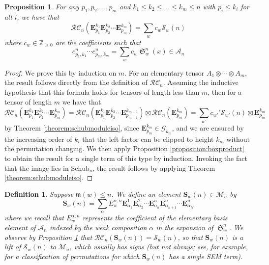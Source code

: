 \documentclass[pdflatex,sn-mathphys-num]{sn-jnl}
\numberwithin{equation}{subsection}
\DeclareMathOperator{\sch}{\mathfrak{S}}
\newcommand{\grass}{\mathcal{G}}
\newcommand{\RC}{\mathcal{RC}}
\newcommand{\coma}{\mathcal{A}}
\newcommand{\maxd}{\mathfrak{m}}
\theoremstyle{thmstyleone}
\newtheorem{proposition}[lemma]{Proposition}
\theoremstyle{thmstylethree}
\newtheorem{definition}[lemma]{Definition}
\theoremstyle{thmstyletwo}
\begin{document}
\begin{proposition} \label{proposition:eproductworks}
For any $p_1,p_2,\ldots,p_m$ and $k_1\leq k_2\leq\ldots\leq k_m\leq n$ with $p_i\leq k_i$ for all $i$, we have that
$$\RC_n(\mathbf{E}_{p_1}^{k_1}\mathbf{E}_{p_2}^{k_2}\cdots\mathbf{E}_{p_m}^{k_m}) = \sum_{w} c_w\mathcal{S}_w(n)$$
where $c_w\in \mathbb{Z}_{\geq 0}$ are the coefficients such that
$$e_{p_1,k_1}^n\cdots e_{p_m,k_m}^n = \sum_w c_w \sch_w^n(x)\in \coma_n$$
\end{proposition}
\begin{proof}
We prove this by induction on $m$. For an elementary tensor $A_1\otimes \cdots \otimes A_m$, the result follows directly from the definition of $\RC_n$. Assuming the inductive hypothesis that this formula holds for tensors of length less than $m$, then for a tensor of length $m$ we have that
$$\RC_n(\mathbf{E}_{p_1}^{k_1}\mathbf{E}_{p_2}^{k_2}\cdots\mathbf{E}_{p_m}^{k_m}) = \RC_n(\mathbf{E}_{p_1}^{k_1}\mathbf{E}_{p_2}^{k_2}\cdots\mathbf{E}_{p_{m-1}}^{k_{m-1}})\boxtimes \RC_n(\mathbf{E}_{p_m}^{k_m})=\sum_{w'} c_{w'}' \mathcal{S}_{w'}(n)\boxtimes \mathbf{E}_{p_m}^{k_m}$$
by Theorem \ref{theorem:schubmoduleiso}, since $\mathbf{E}_{p_m}^{k_m}\in\grass_{k_m}$, and we are ensured by the increasing order of $k_i$ that the left factor can be clipped to height $k_m$ without the permutation changing. We then apply Proposition \ref{proposition:boxproduct} to obtain the result for a single term of this type by induction. Invoking the fact that the image lies in $\mathrm{Schub}_n$, the result follows by applying Theorem \ref{theorem:schubmoduleiso}.
\end{proof}


\begin{definition}
  Suppose $\maxd(w)\leq n$. We define an element $\mathbf{S}_w(n)\in \mathcal{M}_n$ by
  $$\mathbf{S}_w(n) = \sum_{\alpha} E_w^{\alpha;n}\mathbf{E}_{\alpha_1}^1 \mathbf{E}_{\alpha_2}^2 \cdots  \mathbf{E}_{\alpha_n}^n\mathbf{E}_{\alpha_{n+1}}^n\cdots \mathbf{E}_{\alpha_N}^n$$
  where we recall that $E_w^{\alpha;n}$ represents the coefficient of the elementary basis element of $\coma_n$ indexed by the weak composition $\alpha$ in the expansion of $\sch_w^n$. We observe by Proposition \ref{proposition:eproductworks} that $\RC_n(\mathbf{S}_w(n)) = \mathcal{S}_w(n)$, so that $\mathbf{S}_w(n)$ is a lift of $\mathcal{S}_w(n)$ to $\mathcal{M}_n$, which usually has signs (\emph{but not always}; see, for example, \cite{woodruff2025single} for a classification of permutations for which $\mathbf{S}_w(n)$ has a single SEM term).
\end{definition}
\end{document}
